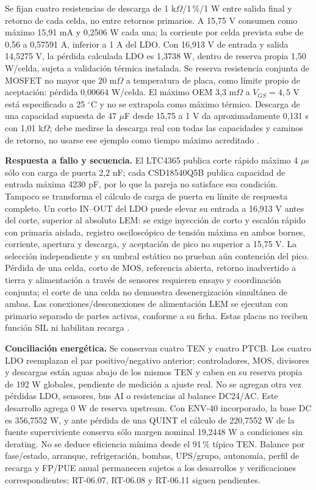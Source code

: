 Se fijan cuatro resistencias de descarga de 1 k$\Omega$/1\,\%/1 W entre salida final y retorno de cada celda, no entre retornos primarios. A 15,75 V consumen como máximo 15,91 mA y 0,2506 W cada una; la corriente por celda prevista sube de 0,56 a 0,57591 A, inferior a 1 A del LDO. Con 16,913 V de entrada y salida 14,5275 V, la pérdida calculada LDO es 1,3738 W, dentro de reserva propia 1,50 W/celda, sujeta a validación térmica instalada. Se reserva resistencia conjunta de MOSFET no mayor que 20 m$\Omega$ a temperatura de placa, como límite propio de aceptación: pérdida 0,00664 W/celda. El máximo OEM 3,3 m$\Omega$ a $V_{GS}=4,5$ V está especificado a 25 $^\circ$C y no se extrapola como máximo térmico. Descarga de una capacidad supuesta de 47 $\mu$F desde 15,75 a 1 V da aproximadamente 0,131 s con 1,01 k$\Omega$; debe medirse la descarga real con todas las capacidades y caminos de retorno, no usarse ese ejemplo como tiempo máximo acreditado \parencites[pp.~1--3]{lote41-mos}[pp.~5--6]{lote38-positive}.

\textbf{Respuesta a fallo y secuencia.} El LTC4365 publica corte rápido máximo 4 $\mu$s sólo con carga de puerta 2,2 nF; cada CSD18540Q5B publica capacidad de entrada máxima 4230 pF, por lo que la pareja no satisface esa condición. Tampoco se transforma el cálculo de carga de puerta en límite de respuesta completo. Un corto IN--OUT del LDO puede elevar su entrada a 16,913 V antes del corte, superior al absoluto LEM: se exige inyección de corto y escalón rápido con primaria aislada, registro osciloscópico de tensión máxima en ambos bornes, corriente, apertura y descarga, y aceptación de pico no superior a 15,75 V. La selección independiente y su umbral estático no prueban aún contención del pico. Pérdida de una celda, corto de MOS, referencia abierta, retorno inadvertido a tierra y alimentación a través de sensores requieren ensayo y coordinación conjunta; el corte de una celda no demuestra desenergización simultánea de ambas. Las conexiones/desconexiones de alimentación LEM se ejecutan con primario separado de partes activas, conforme a su ficha. Estas placas no reciben función SIL ni habilitan recarga \parencites[pp.~3--4]{lote41-ltc}[pp.~1--3]{lote41-mos}[pp.~10--11]{lote35-lem200}.

\textbf{Conciliación energética.} Se conservan cuatro TEN y cuatro PTCB. Los cuatro LDO reemplazan el par positivo/negativo anterior; controladores, MOS, divisores y descargas están aguas abajo de los mismos TEN y caben en su reserva propia de 192 W globales, pendiente de medición a ajuste real. No se agregan otra vez pérdidas LDO, sensores, bus AI o resistencias al balance DC24/AC. Este desarrollo agrega 0 W de reserva upstream. Con ENV-40 incorporado, la base DC es 356,7552 W, y ante pérdida de una QUINT el cálculo de 220,7552 W de la fuente superviviente conserva sólo margen nominal 19,2448 W a condiciones sin derating. No se deduce eficiencia mínima desde el 91\,\% típico TEN. Balance por fase/estado, arranque, refrigeración, bombas, UPS/grupo, autonomía, perfil de recarga y FP/PUE anual permanecen sujetos a los desarrollos y verificaciones correspondientes; RT-06.07, RT-06.08 y RT-06.11 siguen pendientes.
